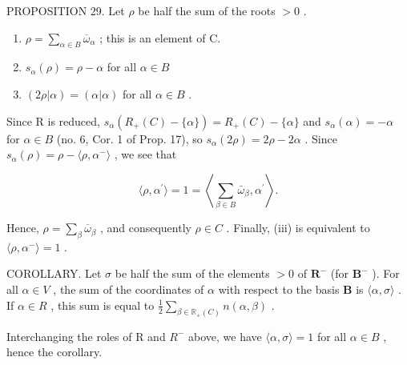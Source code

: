 PROPOSITION 29. Let \(\rho\) be half the sum of the roots \(>0\) .

\begin{enumerate}
\def\labelenumi{(\roman{enumi})}
\item
  \(\rho = \sum_{\alpha \in B} \overline{\omega}_{\alpha}\) ; this is an element of C.
\item
  \(s_{\alpha}(\rho) = \rho -\alpha\) for all \(\alpha \in B\)
\item
  \((2\rho |\alpha) = (\alpha |\alpha)\) for all \(\alpha \in B\) .
\end{enumerate}

Since R is reduced, \(s_{\alpha}(R_{+}(C) - \{\alpha\}) = R_{+}(C) - \{\alpha\}\) and \(s_{\alpha}(\alpha) = -\alpha\) for \(\alpha \in B\) (no. 6, Cor. 1 of Prop. 17), so \(s_{\alpha}(2\rho) = 2\rho - 2\alpha\) . Since \(s_{\alpha}(\rho) = \rho - \langle \rho, \alpha^{-} \rangle\) , we see that

\[
\langle \rho , \alpha^ {\prime} \rangle = 1 = \left\langle \sum_ {\beta \in B} \bar {\omega} _ {\beta}, \alpha^ {\prime} \right\rangle .
\]

Hence, \(\rho = \sum_{\beta} \overline{\omega}_{\beta}\) , and consequently \(\rho \in C\) . Finally, (iii) is equivalent to \(\langle \rho, \alpha^{-} \rangle = 1\) .

COROLLARY. Let \(\sigma\) be half the sum of the elements \(>0\) of \(\mathbf{R}^{-}\) (for \(\mathbf{B}^{-}\) ). For all \(\alpha \in V\) , the sum of the coordinates of \(\alpha\) with respect to the basis \(\mathbf{B}\) is \(\langle \alpha, \sigma \rangle\) . If \(\alpha \in R\) , this sum is equal to \(\frac{1}{2} \sum_{\beta \in \mathbb{R}_{+}(C)} n(\alpha, \beta)\) .

Interchanging the roles of R and \(R^{-}\) above, we have \(\langle\alpha,\sigma\rangle=1\) for all \(\alpha\in B\) , hence the corollary.


